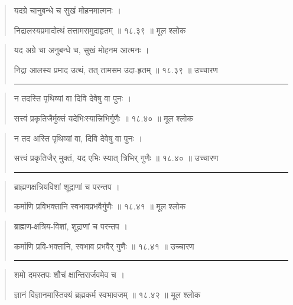 \begin{quotation}

यदग्रे चानुबन्धे च सुखं मोहनमात्मनः ।  

निद्रालस्यप्रमादोत्थं तत्तामसमुदाहृतम्‌  ॥ १८.३९ ॥  मूल श्लोक
\end{quotation}

\begin{quotation}

यद अग्रे चा अनुबन्धे च, सुखं मोहनम आत्मनः ।  

निद्रा आलस्य प्रमाद उत्थं, तत् तामसम उदा-हृतम्‌  ॥ १८.३९ ॥  उच्चारण

\noindent\rule{16cm}{0.4pt} 
\end{quotation}


\begin{quotation}

न तदस्ति पृथिव्यां वा दिवि देवेषु वा पुनः ।  

सत्त्वं प्रकृतिजैर्मुक्तं यदेभिःस्यात्त्रिभिर्गुणैः  ॥ १८.४० ॥  मूल श्लोक
\end{quotation}

\begin{quotation}

न तद अस्ति पृथिव्यां वा, दिवि देवेषु वा पुनः ।  

सत्त्वं प्रकृतिजैर्  मुक्तं, यद एभिः स्यात् त्रिभिर् गुणैः  ॥ १८.४० ॥  उच्चारण

\noindent\rule{16cm}{0.4pt} 
\end{quotation}


\begin{quotation}

ब्राह्मणक्षत्रियविशां शूद्राणां च परन्तप ।  

कर्माणि प्रविभक्तानि स्वभावप्रभवैर्गुणैः  ॥ १८.४१ ॥  मूल श्लोक
\end{quotation}

\begin{quotation}
ब्राह्मण-क्षत्रिय-विशां, शूद्राणां च परन्तप ।  

कर्माणि प्रवि-भक्तानि, स्वभाव प्रभवैर् गुणैः  ॥ १८.४१ ॥  उच्चारण

\noindent\rule{16cm}{0.4pt} 
\end{quotation}


\begin{quotation}

शमो दमस्तपः शौचं क्षान्तिरार्जवमेव च ।  

ज्ञानं विज्ञानमास्तिक्यं ब्रह्मकर्म स्वभावजम्‌  ॥ १८.४२ ॥  मूल श्लोक
\end{quotation}

